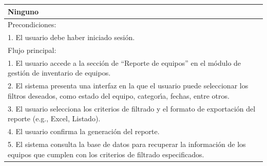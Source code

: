 \documentclass[stu, 12pt, letterpaper, donotrepeattitle, floatsintext, natbib]{apa7}
\begin{document}
\begin{longtable}{@{} p{16.5cm} @{}}
    Ninguno                                                                                                                                                                                                                                                                      \\ \midrule
    Precondiciones:                                                                                                                                                                                                                                                              \\
    1. El usuario debe haber iniciado sesi\'on.                                                                                                                                                                                                                                  \\ \midrule
    Flujo principal:                                                                                                                                                                                                                                                             \\
    1. El usuario accede a la secci\'on de ``Reporte de equipos'' en el m\'odulo de gesti\'on de inventario de equipos.                                                                                                                                                          \\
    2. El sistema presenta una interfaz en la que el usuario puede seleccionar los filtros deseados, como estado del equipo, categor\'{\i}a, fechas, entre otros.                                                                                                                \\
    3. El usuario selecciona los criterios de filtrado y el formato de exportaci\'on del reporte (e.g., Excel, Listado).                                                                                                                                                         \\
    4. El usuario confirma la generaci\'on del reporte.                                                                                                                                                                                                                          \\
    5. El sistema consulta la base de datos para recuperar la informaci\'on de los equipos que cumplen con los criterios de filtrado especificados.                                                                                                                              \\

\end{longtable}
\end{document}
